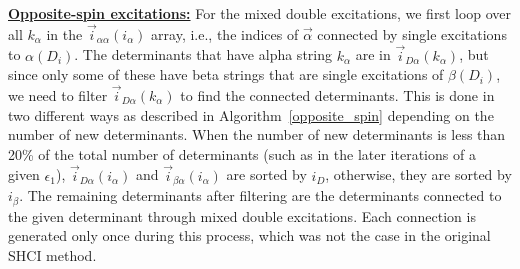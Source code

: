 \documentclass[%
reprint,
 superscriptaddress,
 amsmath,amssymb,
 aps,
]{revtex4-1}
\def\vecD{\vec{D}}
\def\veca{\vec{\alpha}}
\def\vecb{\vec{\beta}}
\def\ia{i_\alpha}
\def\ib{i_\beta}
\def\veciDa{\vec{i}_{D\alpha}}
\def\veciaa{\vec{i}_{\alpha\alpha}}
\def\veciba{\vec{i}_{\beta\alpha}}
\begin{document}
\noindent \underline{\bf Opposite-spin excitations:} For the mixed double excitations, we first loop over all $k_\alpha$ in the $\veciaa(\ia)$ array,
i.e., the indices of $\veca$ connected by single excitations to $\alpha(D_i)$.
The determinants that have alpha string $k_\alpha$ are in $\veciDa(k_\alpha)$, but since only some of these
have beta strings that are single excitations of $\beta(D_i)$, we need to filter $\veciDa(k_\alpha)$
to find the connected determinants.
This is done in two different ways as described in Algorithm~\ref{opposite_spin}
depending on the number of new determinants.
When the number of new determinants is less than 20\% of the total number of determinants (such as in the later iterations of a given $\epsilon_1$), $\veciDa(\ia)$ and $\veciba(\ia)$ are sorted by $i_D$, otherwise, they are sorted by $\ib$.
The remaining determinants after filtering are the determinants connected to the given determinant through mixed double excitations.
Each connection is generated only once during this process, which was not the case in the
original SHCI method.

\end{document}
